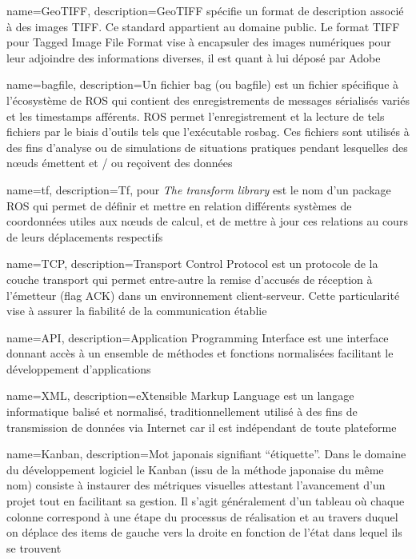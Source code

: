 {
  name={GeoTIFF},
    description={GeoTIFF spécifie un format de description associé à des images TIFF. Ce standard appartient au domaine public. 
    Le format TIFF pour Tagged Image File Format vise à encapsuler des images numériques pour leur adjoindre des informations diverses, il est quant à lui déposé par Adobe}
}

{
  name={bagfile},
    description={Un fichier bag (ou bagfile) est un fichier spécifique à l'écosystème de ROS qui contient des enregistrements de messages sérialisés variés et les timestamps afférents. 
    ROS permet l'enregistrement et la lecture de tels fichiers par le biais d'outils tels que l'exécutable rosbag.
    Ces fichiers sont utilisés à des fins d'analyse ou de simulations de situations pratiques pendant lesquelles des n\oe{}uds émettent et / ou reçoivent des données}
}

{
  name={tf},
    description={Tf, pour \emph{The transform library} est le nom d'un package ROS qui permet de définir et mettre en relation différents systèmes de coordonnées utiles aux n\oe{}uds de calcul, et de mettre à jour ces 
    relations au cours de leurs déplacements respectifs}
}

{
  name={TCP},
    description={Transport Control Protocol est un protocole de la couche transport qui permet entre-autre la remise d'accusés de réception à l'émetteur (flag ACK) dans un environnement client-serveur. 
    Cette particularité vise à assurer la fiabilité de la communication établie}
}

{
  name={API},
    description={Application Programming Interface est une interface donnant accès à un ensemble de méthodes et fonctions normalisées facilitant le développement d'applications}
}

{
  name={XML},
    description={eXtensible Markup Language est un langage informatique balisé et normalisé, traditionnellement utilisé à des fins de transmission de données via Internet car il est indépendant de toute plateforme}
}

{
  name={Kanban},
    description={Mot japonais signifiant  ``étiquette''. Dans le domaine du développement logiciel le Kanban (issu de la méthode japonaise du même nom) consiste à instaurer des métriques visuelles attestant l'avancement d'un projet tout en facilitant sa gestion. 
    Il s'agit généralement d'un tableau où chaque colonne correspond à une étape du processus de réalisation et au travers duquel on déplace des items de gauche vers la droite en fonction de l'état dans lequel ils se trouvent}
}

